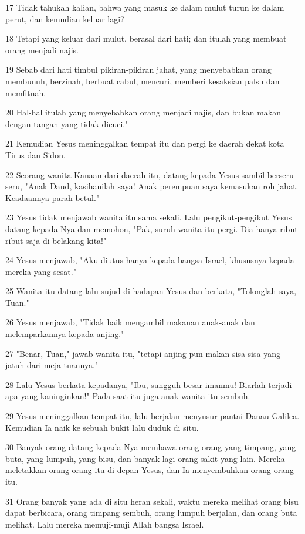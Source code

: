 \par 17 Tidak tahukah kalian, bahwa yang masuk ke dalam mulut turun ke dalam perut, dan kemudian keluar lagi?
\par 18 Tetapi yang keluar dari mulut, berasal dari hati; dan itulah yang membuat orang menjadi najis.
\par 19 Sebab dari hati timbul pikiran-pikiran jahat, yang menyebabkan orang membunuh, berzinah, berbuat cabul, mencuri, memberi kesaksian palsu dan memfitnah.
\par 20 Hal-hal itulah yang menyebabkan orang menjadi najis, dan bukan makan dengan tangan yang tidak dicuci."
\par 21 Kemudian Yesus meninggalkan tempat itu dan pergi ke daerah dekat kota Tirus dan Sidon.
\par 22 Seorang wanita Kanaan dari daerah itu, datang kepada Yesus sambil berseru-seru, "Anak Daud, kasihanilah saya! Anak perempuan saya kemasukan roh jahat. Keadaannya parah betul."
\par 23 Yesus tidak menjawab wanita itu sama sekali. Lalu pengikut-pengikut Yesus datang kepada-Nya dan memohon, "Pak, suruh wanita itu pergi. Dia hanya ribut-ribut saja di belakang kita!"
\par 24 Yesus menjawab, "Aku diutus hanya kepada bangsa Israel, khususnya kepada mereka yang sesat."
\par 25 Wanita itu datang lalu sujud di hadapan Yesus dan berkata, "Tolonglah saya, Tuan."
\par 26 Yesus menjawab, "Tidak baik mengambil makanan anak-anak dan melemparkannya kepada anjing."
\par 27 "Benar, Tuan," jawab wanita itu, "tetapi anjing pun makan sisa-sisa yang jatuh dari meja tuannya."
\par 28 Lalu Yesus berkata kepadanya, "Ibu, sungguh besar imanmu! Biarlah terjadi apa yang kauinginkan!" Pada saat itu juga anak wanita itu sembuh.
\par 29 Yesus meninggalkan tempat itu, lalu berjalan menyusur pantai Danau Galilea. Kemudian Ia naik ke sebuah bukit lalu duduk di situ.
\par 30 Banyak orang datang kepada-Nya membawa orang-orang yang timpang, yang buta, yang lumpuh, yang bisu, dan banyak lagi orang sakit yang lain. Mereka meletakkan orang-orang itu di depan Yesus, dan Ia menyembuhkan orang-orang itu.
\par 31 Orang banyak yang ada di situ heran sekali, waktu mereka melihat orang bisu dapat berbicara, orang timpang sembuh, orang lumpuh berjalan, dan orang buta melihat. Lalu mereka memuji-muji Allah bangsa Israel.
